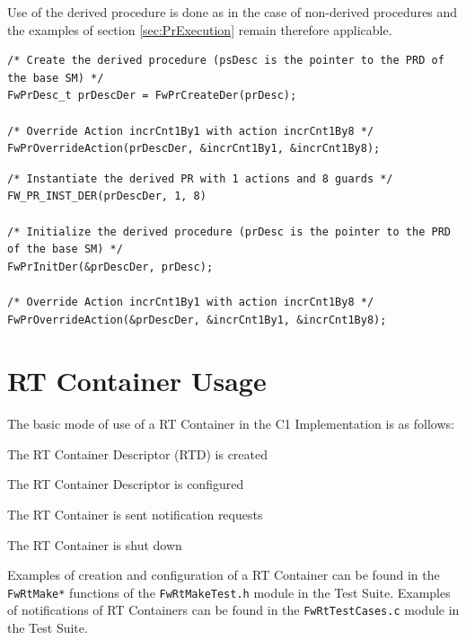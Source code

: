 \documentclass[manual]{../fwprofile}
\begin{document}
Use of the derived procedure is done as in the case of non-derived procedures and the examples of section \ref{sec:PrExecution} 
remain therefore applicable.


\begin{lstlisting}
/* Create the derived procedure (psDesc is the pointer to the PRD of the base SM) */
FwPrDesc_t prDescDer = FwPrCreateDer(prDesc);

/* Override Action incrCnt1By1 with action incrCnt1By8 */
FwPrOverrideAction(prDescDer, &incrCnt1By1, &incrCnt1By8);

\end{lstlisting}


\begin{lstlisting}
/* Instantiate the derived PR with 1 actions and 8 guards */
FW_PR_INST_DER(prDescDer, 1, 8)

/* Initialize the derived procedure (prDesc is the pointer to the PRD of the base SM) */
FwPrInitDer(&prDescDer, prDesc);

/* Override Action incrCnt1By1 with action incrCnt1By8 */
FwPrOverrideAction(&prDescDer, &incrCnt1By1, &incrCnt1By8);
\end{lstlisting}


\section{RT Container Usage}\label{sec:rtUsage}

The basic mode of use of a RT Container in the C1 Implementation is as follows:

\begin{fw_itemize}
\item The RT Container Descriptor (RTD) is created
\item The RT Container Descriptor is configured
\item The RT Container is sent notification requests 
\item The RT Container is shut down
\end{fw_itemize}

Examples of creation and configuration of a RT Container can be found in the \texttt{FwRtMake*} functions of the \texttt{FwRtMakeTest.h} module in the Test Suite. Examples of notifications of RT Containers can be found in the \texttt{FwRtTestCases.c} module in the Test Suite.
\end{document}
